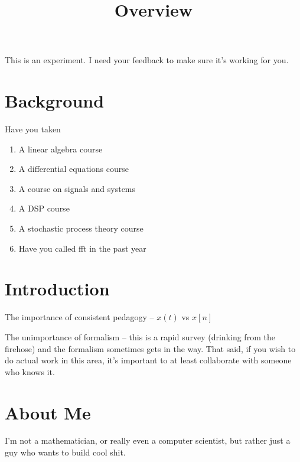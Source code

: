 

\title{Overview}

\maketitle


This is an experiment. I need your feedback to make sure it's working
for you.


\section{Background}


Have you taken

\begin{enumerate}
\item A linear algebra course
\item A differential equations course
\item A course on signals and systems
\item A DSP course
\item A stochastic process theory course
\item Have you called fft in the past year
\end{enumerate}

\section{Introduction}
The importance of consistent pedagogy -- $x(t)$ vs $x[n]$ 

The unimportance of formalism -- this is a rapid survey (drinking from the 
firehose) and the formalism sometimes gets in the way. That said, if you
wish to do actual work in this area, it's important to at least collaborate
with someone who knows it. 

\section{About Me}
I'm not a mathematician, or really even a computer scientist, but rather
just a guy who wants to build cool shit. 

